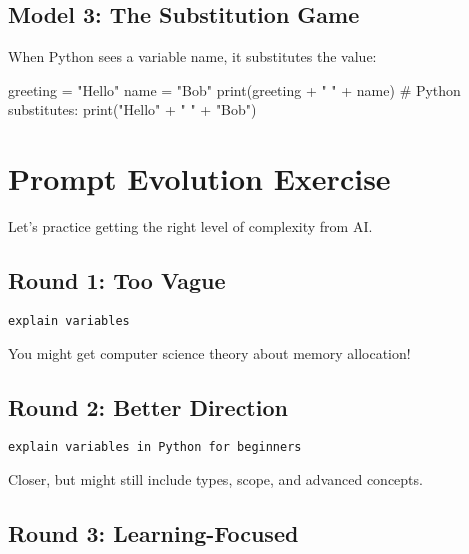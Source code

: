 \documentclass[
  letterpaper,
  DIV=11,
  numbers=noendperiod,
  oneside]{scrreprt}
\newenvironment{Shaded}{}{}
\newcommand{\BuiltInTok}[1]{\textcolor[rgb]{0.84,0.23,0.29}{#1}}
\newcommand{\CommentTok}[1]{\textcolor[rgb]{0.42,0.45,0.49}{#1}}
\newcommand{\NormalTok}[1]{\textcolor[rgb]{0.14,0.16,0.18}{#1}}
\newcommand{\OperatorTok}[1]{\textcolor[rgb]{0.14,0.16,0.18}{#1}}
\newcommand{\StringTok}[1]{\textcolor[rgb]{0.01,0.18,0.38}{#1}}
\begin{document}
\subsection{Model 3: The Substitution
Game}\label{model-3-the-substitution-game}

When Python sees a variable name, it substitutes the value:

\begin{Shaded}
\begin{Highlighting}[]
\NormalTok{greeting }\OperatorTok{=} \StringTok{"Hello"}
\NormalTok{name }\OperatorTok{=} \StringTok{"Bob"}
\BuiltInTok{print}\NormalTok{(greeting }\OperatorTok{+} \StringTok{" "} \OperatorTok{+}\NormalTok{ name)}
\CommentTok{\# Python substitutes: print("Hello" + " " + "Bob")}
\end{Highlighting}
\end{Shaded}

\section{Prompt Evolution Exercise}\label{prompt-evolution-exercise-1}

Let's practice getting the right level of complexity from AI.

\subsection{Round 1: Too Vague}\label{round-1-too-vague-1}

\begin{verbatim}
explain variables
\end{verbatim}

You might get computer science theory about memory allocation!

\subsection{Round 2: Better Direction}\label{round-2-better-direction}

\begin{verbatim}
explain variables in Python for beginners
\end{verbatim}

Closer, but might still include types, scope, and advanced concepts.

\subsection{Round 3: Learning-Focused}\label{round-3-learning-focused-1}
\end{document}

